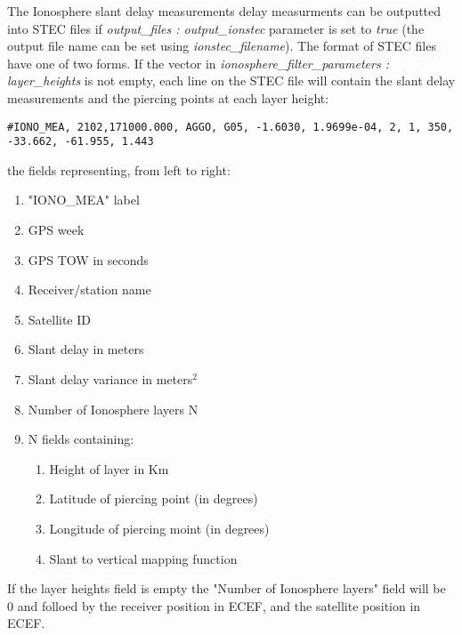 The Ionosphere slant delay measurements delay measurments can be outputted into STEC files if \textit{output\_files : output\_ionstec} parameter is set to \textit{true} (the output file name can be set using \textit{ionstec\_filename}).
The format of STEC files have one of two forms. If the vector in \textit{ionosphere\_filter\_parameters : layer\_heights} is not empty, each line on the STEC file will contain the slant delay measurements and the piercing points at each layer height:
 \begin{lstlisting}
#IONO_MEA, 2102,171000.000, AGGO, G05, -1.6030, 1.9699e-04, 2, 1, 350, -33.662, -61.955, 1.443
\end{lstlisting}
the fields representing, from left to right:
\begin{enumerate}
	\item  "IONO\_MEA" label
	\item  GPS week
	\item  GPS TOW in seconds
	\item  Receiver/station name
	\item  Satellite ID
	\item  Slant delay in meters
	\item  Slant delay variance in meters$^2$
	\item  Number of Ionosphere layers N
	\item  N fields containing: 
	\begin{enumerate}
		\item Height of layer in Km
		\item Latitude of piercing point (in degrees)
		\item Longitude of piercing moint (in degrees)
		\item Slant to vertical mapping function
	\end {enumerate}  
\end{enumerate}
If the layer heights field is empty the "Number of Ionosphere layers" field will be 0 and folloed by the receiver position in ECEF, and the satellite position in ECEF.\\

